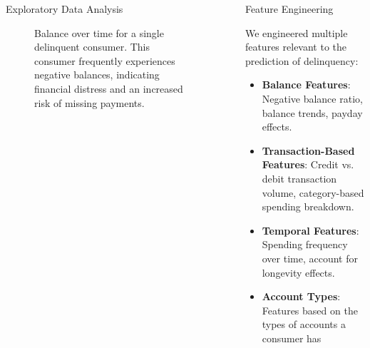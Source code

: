 \documentclass[final]{beamer}
\newlength{\sepwidth}
\newlength{\colwidth}
\newcommand{\separatorcolumn}{\begin{column}{\sepwidth}\end{column}}
\begin{document}
\begin{frame}[t]
\begin{columns}[t]
\begin{column}{\colwidth}
\begin{block}{Exploratory Data Analysis}
\begin{figure}[H]
\begin{minipage}{0.48\textwidth}
            \caption{Balance over time for a single delinquent consumer. This consumer frequently experiences negative balances, indicating financial distress and an increased risk of missing payments.}
            \label{fig:balance_single_delinquent}
        \end{minipage}
    \end{figure}

  \end{block}




\end{column}

\separatorcolumn

\begin{column}{\colwidth}

  \begin{block}{Feature Engineering}

    We engineered multiple features relevant to the prediction of delinquency:
    \begin{itemize}
        \item \textbf{Balance Features}: Negative balance ratio, balance trends, payday effects.
        \item \textbf{Transaction-Based Features}: Credit vs. debit transaction volume, category-based spending breakdown.
        \item \textbf{Temporal Features}: Spending frequency over time, account for longevity effects.
        \item \textbf{Account Types}: Features based on the types of accounts a consumer has
    \end{itemize}


\end{block}
\end{column}
\end{columns}
\end{frame}
\end{document}
